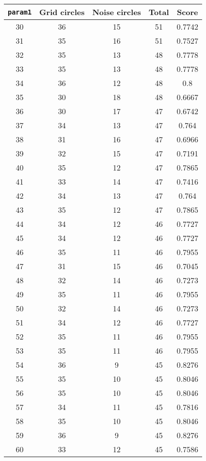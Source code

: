 \documentclass[letterpaper, 12pt]{article}
\begin{document}
\begin{longtable}{|c|c|c|c|c|}
\hline
\textbf{\texttt{param1}} & \textbf{Grid circles} & \textbf{Noise circles} & \textbf{Total} & \textbf{Score} \\
\hline
30 & 36 & 15 & 51 & 0.7742 \\
\hline
31 & 35 & 16 & 51 & 0.7527 \\
\hline
32 & 35 & 13 & 48 & 0.7778 \\
\hline
33 & 35 & 13 & 48 & 0.7778 \\
\hline
34 & 36 & 12 & 48 & 0.8 \\
\hline
35 & 30 & 18 & 48 & 0.6667 \\
\hline
36 & 30 & 17 & 47 & 0.6742 \\
\hline
37 & 34 & 13 & 47 & 0.764 \\
\hline
38 & 31 & 16 & 47 & 0.6966 \\
\hline
39 & 32 & 15 & 47 & 0.7191 \\
\hline
40 & 35 & 12 & 47 & 0.7865 \\
\hline
41 & 33 & 14 & 47 & 0.7416 \\
\hline
42 & 34 & 13 & 47 & 0.764 \\
\hline
43 & 35 & 12 & 47 & 0.7865 \\
\hline
44 & 34 & 12 & 46 & 0.7727 \\
\hline
45 & 34 & 12 & 46 & 0.7727 \\
\hline
46 & 35 & 11 & 46 & 0.7955 \\
\hline
47 & 31 & 15 & 46 & 0.7045 \\
\hline
48 & 32 & 14 & 46 & 0.7273 \\
\hline
49 & 35 & 11 & 46 & 0.7955 \\
\hline
50 & 32 & 14 & 46 & 0.7273 \\
\hline
51 & 34 & 12 & 46 & 0.7727 \\
\hline
52 & 35 & 11 & 46 & 0.7955 \\
\hline
53 & 35 & 11 & 46 & 0.7955 \\
\hline
54 & 36 & 9 & 45 & 0.8276 \\
\hline
55 & 35 & 10 & 45 & 0.8046 \\
\hline
56 & 35 & 10 & 45 & 0.8046 \\
\hline
57 & 34 & 11 & 45 & 0.7816 \\
\hline
58 & 35 & 10 & 45 & 0.8046 \\
\hline
59 & 36 & 9 & 45 & 0.8276 \\
\hline
60 & 33 & 12 & 45 & 0.7586 \\

\end{longtable}
\end{document}
